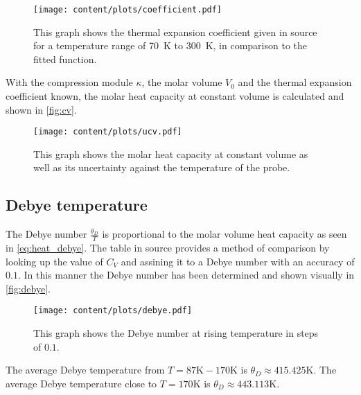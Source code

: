 \begin{figure}[H]
    \centering
    \texttt{[image: content/plots/coefficient.pdf]}
    \caption{This graph shows the thermal expansion coefficient given in source \cite{V47} for a temperature range of \SI{70}{\kelvin} to \SI{300}{\kelvin}, in comparison to the fitted function.}
    \label{fig:expansion}
\end{figure}

With the compression module $\kappa$, the molar volume $V_0$ and the thermal expansion coefficient known, the molar heat capacity at constant volume is calculated and shown in \autoref{fig:cv}.

\begin{figure}[H]
    \centering
    \texttt{[image: content/plots/ucv.pdf]}
    \caption{This graph shows the molar heat capacity at constant volume as well as its uncertainty against the temperature of the probe.}
    \label{fig:cv}
\end{figure}

\subsection{Debye temperature}
The Debye number $\frac{\theta_D}{T}$ is proportional to the molar volume heat capacity as seen in \autoref{eq:heat_debye}.
The table in source \cite{V47} provides a method of comparison by looking up the value of $C_V$ and assining it to a Debye number with an accuracy of $0.1$.
In this manner the Debye number has been determined and shown visually in \autoref{fig:debye}.

\begin{figure}[H]
    \centering
    \texttt{[image: content/plots/debye.pdf]}
    \caption{This graph shows the Debye number at rising temperature in steps of $0.1$.}
    \label{fig:debye}
\end{figure}

The average Debye temperature from $T = 87\si{\kelvin} - 170\si{\kelvin}$ is $\theta_D \approx 415.425\si{\kelvin}$.
The average Debye temperature close to $T = 170\si{\kelvin}$ is $\theta_D \approx 443.113\si{\kelvin}$.

